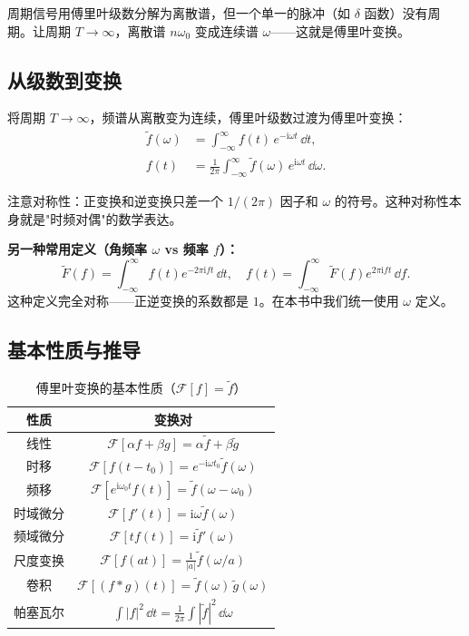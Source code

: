 周期信号用傅里叶级数分解为离散谱，但一个单一的脉冲（如 $\delta$ 函数）没有周期。让周期 $T\to\infty$，离散谱 $n\omega_0$ 变成连续谱 $\omega$——这就是傅里叶变换。

\subsection{从级数到变换}

将周期 $T\to\infty$，频谱从离散变为连续，傅里叶级数过渡为傅里叶变换：
\begin{align}
\tilde{f}(\omega) &= \int_{-\infty}^{\infty} f(t)\,e^{-\mathrm{i}\omega t}\,\dd t,\\
f(t) &= \frac{1}{2\pi}\int_{-\infty}^{\infty} \tilde{f}(\omega)\,e^{\mathrm{i}\omega t}\,\dd\omega.
\label{eq:fourier_transform}
\end{align}

注意对称性：正变换和逆变换只差一个 $1/(2\pi)$ 因子和 $\omega$ 的符号。这种对称性本身就是"时频对偶"的数学表达。

\textbf{另一种常用定义（角频率 $\omega$ vs 频率 $f$）：}
\begin{equation}
\tilde{F}(f) = \int_{-\infty}^{\infty} f(t) e^{-2\pi\mathrm{i}ft}\,\dd t,
\quad
f(t) = \int_{-\infty}^{\infty} \tilde{F}(f) e^{2\pi\mathrm{i}ft}\,\dd f.
\end{equation}
这种定义完全对称——正逆变换的系数都是 $1$。在本书中我们统一使用 $\omega$ 定义。

\subsection{基本性质与推导}

\begin{table}[h]
\centering
\caption{傅里叶变换的基本性质（$\mathcal{F}[f] = \tilde{f}$）}
\label{tab:ft_properties}
\begin{tabular}{c|c}
\toprule
性质 & 变换对 \\
\midrule
线性 & $\mathcal{F}[\alpha f+\beta g] = \alpha\tilde{f}+\beta\tilde{g}$ \\
时移 & $\mathcal{F}[f(t-t_0)] = e^{-\mathrm{i}\omega t_0}\tilde{f}(\omega)$ \\
频移 & $\mathcal{F}[e^{\mathrm{i}\omega_0 t}f(t)] = \tilde{f}(\omega-\omega_0)$ \\
时域微分 & $\mathcal{F}[f'(t)] = \mathrm{i}\omega\tilde{f}(\omega)$ \\
频域微分 & $\mathcal{F}[t f(t)] = \mathrm{i}\tilde{f}'(\omega)$ \\
尺度变换 & $\mathcal{F}[f(at)] = \frac{1}{|a|}\tilde{f}(\omega/a)$ \\
卷积 & $\mathcal{F}[(f*g)(t)] = \tilde{f}(\omega)\,\tilde{g}(\omega)$ \\
帕塞瓦尔 & $\int |f|^2\,\dd t = \frac{1}{2\pi}\int |\tilde{f}|^2\,\dd\omega$ \\
\bottomrule
\end{tabular}
\end{table}


